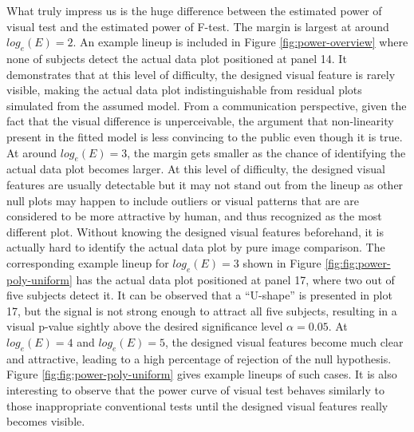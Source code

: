 \documentclass[]{interact}
\theoremstyle{plain}%
\theoremstyle{definition}
\theoremstyle{remark}
\begin{document}
What truly impress us is the huge difference between the estimated power
of visual test and the estimated power of F-test. The margin is largest
at around \(log_e(E) = 2\). An example lineup is included in Figure
\ref{fig:power-overview} where none of subjects detect the actual data
plot positioned at panel 14. It demonstrates that at this level of
difficulty, the designed visual feature is rarely visible, making the
actual data plot indistinguishable from residual plots simulated from
the assumed model. From a communication perspective, given the fact that
the visual difference is unperceivable, the argument that non-linearity
present in the fitted model is less convincing to the public even though
it is true. At around \(log_e(E) = 3\), the margin gets smaller as the
chance of identifying the actual data plot becomes larger. At this level
of difficulty, the designed visual features are usually detectable but
it may not stand out from the lineup as other null plots may happen to
include outliers or visual patterns that are are considered to be more
attractive by human, and thus recognized as the most different plot.
Without knowing the designed visual features beforehand, it is actually
hard to identify the actual data plot by pure image comparison. The
corresponding example lineup for \(log_e(E) = 3\) shown in Figure
\ref{fig:fig:power-poly-uniform} has the actual data plot positioned at
panel 17, where two out of five subjects detect it. It can be observed
that a ``U-shape'' is presented in plot 17, but the signal is not strong
enough to attract all five subjects, resulting in a visual p-value
sightly above the desired significance level \(\alpha = 0.05\). At
\(log_e(E) = 4\) and \(log_e(E) = 5\), the designed visual features
become much clear and attractive, leading to a high percentage of
rejection of the null hypothesis. Figure
\ref{fig:fig:power-poly-uniform} gives example lineups of such cases. It
is also interesting to observe that the power curve of visual test
behaves similarly to those inappropriate conventional tests until the
designed visual features really becomes visible.
\end{document}
